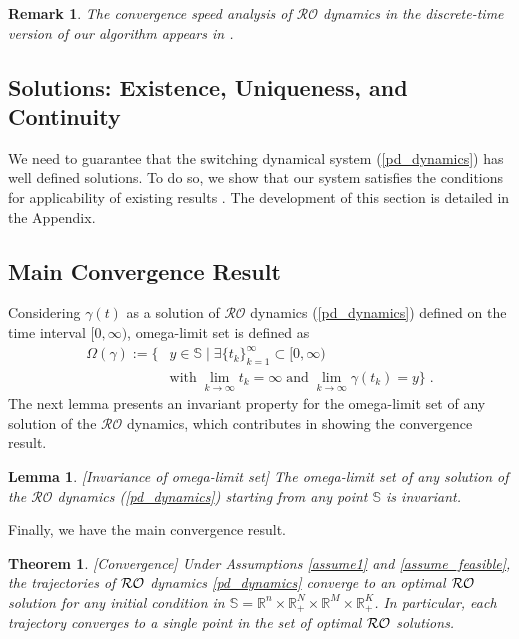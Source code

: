 \documentclass[journal,twoside,web]{ieeecolor}
\newcommand{\rev}[1]{\textcolor{revisionblue}{#1}}
\newtheorem{theorem}{Theorem}
\newtheorem{lemma}{Lemma}
\newtheorem{remark}{Remark}
\begin{document}
\begin{remark} \label{convergence_speed}
The convergence speed analysis of $\mathcal{RO}$ dynamics in the discrete-time version of our algorithm appears in \cite{ebrahimi2019cdc}.
\end{remark}

\subsection*{\rev{Solutions: Existence, Uniqueness, and Continuity}}
We need to guarantee that the switching dynamical system (\ref{pd_dynamics}) has well defined solutions.
To do so, we show that our system satisfies the conditions for applicability of existing results \cite{cherukuri2016}. The development of this section is detailed in the Appendix.

\subsection*{\rev{Main Convergence Result}}
Considering $\gamma(t)$ as a solution of $\mathcal{RO}$ dynamics (\ref{pd_dynamics}) defined on the time interval $[0,\infty)$, omega-limit set is defined as
\begin{align} \label{omega_limit}
\Omega(\gamma):=\{& y \in \mathbb S \;|\; \exists \{t_k\}_{k=1}^\infty \subset [0,\infty) \nonumber\\
&\text{with}\; \lim_{k \rightarrow \infty} t_k=\infty \;\text{and}\; \lim_{k \rightarrow \infty} \gamma(t_k)=y\}\;.
\end{align}
The next lemma presents an invariant property for the omega-limit set of any solution of the $\mathcal{RO}$ dynamics, which contributes in showing the convergence result.
\begin{lemma}\cite[Lemma~4.4]{cherukuri2016}[Invariance of omega-limit set]
The omega-limit set of any solution of the $\mathcal{RO}$ dynamics (\ref{pd_dynamics}) starting from any point $\mathbb S$ is invariant.
\label{omega_invariance}
\end{lemma}

Finally, we have the main convergence result.
\begin{theorem}\label{maintheorem}[Convergence]
\rev{Under Assumptions \ref{assume1} and \ref{assume_feasible}, the trajectories of ${\cal RO}$ dynamics \eqref{pd_dynamics} converge to an optimal ${\cal RO}$ solution for any initial condition in $\mathbb{S}=\mathbb{R}^n\times \mathbb{R}^N_{+}\times \mathbb{R}^M\times \mathbb{R}^K_+$. In particular, each trajectory converges to a single point in the set of optimal ${\cal RO}$ solutions.}
\end{theorem}
\end{document}
